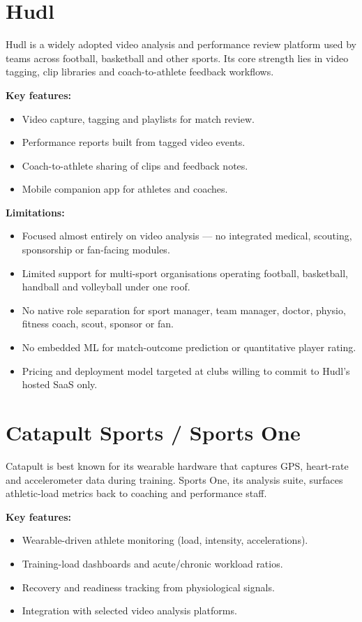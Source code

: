 \documentclass[12pt,a4paper,oneside]{report}
\begin{document}
\section{Hudl}
\label{sec:prevwork-hudl}
Hudl is a widely adopted video analysis and performance review platform
used by teams across football, basketball and other sports. Its core
strength lies in video tagging, clip libraries and coach-to-athlete
feedback workflows.

\textbf{Key features:}
\begin{itemize}[leftmargin=*]
  \item Video capture, tagging and playlists for match review.
  \item Performance reports built from tagged video events.
  \item Coach-to-athlete sharing of clips and feedback notes.
  \item Mobile companion app for athletes and coaches.
\end{itemize}

\textbf{Limitations:}
\begin{itemize}[leftmargin=*]
  \item Focused almost entirely on video analysis --- no integrated
        medical, scouting, sponsorship or fan-facing modules.
  \item Limited support for multi-sport organisations operating
        football, basketball, handball and volleyball under one roof.
  \item No native role separation for sport manager, team manager,
        doctor, physio, fitness coach, scout, sponsor or fan.
  \item No embedded ML for match-outcome prediction or quantitative
        player rating.
  \item Pricing and deployment model targeted at clubs willing to
        commit to Hudl's hosted SaaS only.
\end{itemize}

\section{Catapult Sports / Sports One}
\label{sec:prevwork-catapult}
Catapult is best known for its wearable hardware that captures GPS,
heart-rate and accelerometer data during training. Sports One, its
analysis suite, surfaces athletic-load metrics back to coaching and
performance staff.

\textbf{Key features:}
\begin{itemize}[leftmargin=*]
  \item Wearable-driven athlete monitoring (load, intensity,
        accelerations).
  \item Training-load dashboards and acute/chronic workload ratios.
  \item Recovery and readiness tracking from physiological signals.
  \item Integration with selected video analysis platforms.
\end{itemize}
\end{document}
